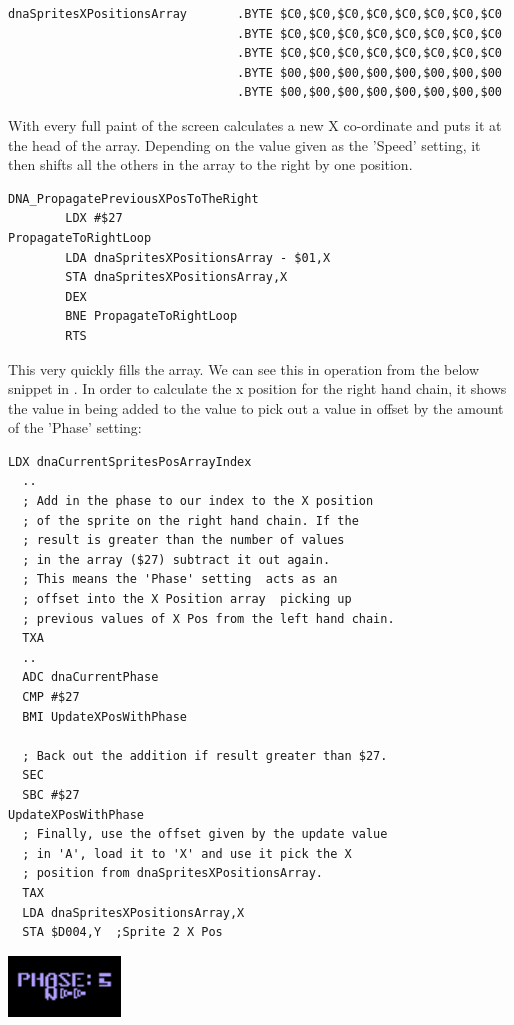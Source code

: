 \begin{lstlisting}
dnaSpritesXPositionsArray       .BYTE $C0,$C0,$C0,$C0,$C0,$C0,$C0,$C0
                                .BYTE $C0,$C0,$C0,$C0,$C0,$C0,$C0,$C0
                                .BYTE $C0,$C0,$C0,$C0,$C0,$C0,$C0,$C0
                                .BYTE $00,$00,$00,$00,$00,$00,$00,$00
                                .BYTE $00,$00,$00,$00,$00,$00,$00,$00
\end{lstlisting}

With every full paint of the screen calculates a new X co-ordinate and puts it at the head of the array. Depending
on the value given as the 'Speed' setting, it then shifts all the others in the array to the right by one position. 

\begin{lstlisting}
DNA_PropagatePreviousXPosToTheRight
        LDX #$27
PropagateToRightLoop   
        LDA dnaSpritesXPositionsArray - $01,X
        STA dnaSpritesXPositionsArray,X
        DEX
        BNE PropagateToRightLoop
        RTS
\end{lstlisting}

This very quickly fills the array.  We can see this in operation from the below
snippet in . In order to calculate the x position
for the right hand chain, it shows the value in
 being added to the value
 to pick out a value in
 offset by the amount of the 'Phase' setting:

\begin{minipage}[b]{0.75\linewidth}
\centering
\begin{lstlisting}[caption=\icode{dnaCurrentPhase} is set by the 'Q' key.]
  LDX dnaCurrentSpritesPosArrayIndex
  ..
  ; Add in the phase to our index to the X position
  ; of the sprite on the right hand chain. If the 
  ; result is greater than the number of values
  ; in the array ($27) subtract it out again.
  ; This means the 'Phase' setting  acts as an 
  ; offset into the X Position array  picking up 
  ; previous values of X Pos from the left hand chain.
  TXA
  ..
  ADC dnaCurrentPhase
  CMP #$27
  BMI UpdateXPosWithPhase

  ; Back out the addition if result greater than $27.
  SEC
  SBC #$27
UpdateXPosWithPhase   
  ; Finally, use the offset given by the update value 
  ; in 'A', load it to 'X' and use it pick the X 
  ; position from dnaSpritesXPositionsArray.
  TAX
  LDA dnaSpritesXPositionsArray,X
  STA $D004,Y  ;Sprite 2 X Pos
\end{lstlisting}
\end{minipage}
\hspace{0.5cm}
\begin{minipage}[b]{0.25\linewidth}
\centering
      \includegraphics[width=3cm]{dna/dnaphase.png}%
      \vspace{5cm}
\end{minipage}

